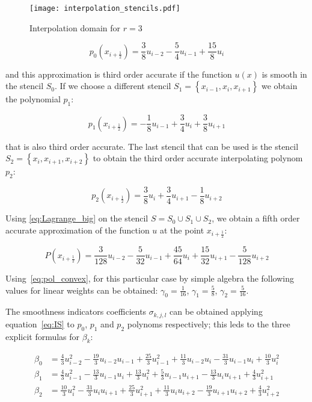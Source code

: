 \begin{figure}
   \centering
   \texttt{[image: interpolation\_stencils.pdf]}
   \caption{Interpolation domain for $r=3$}
   \label{fig:stencils_3}
\end{figure}

\begin{equation}
  \label{eq:pol_0}
  p_0(x_{i+\frac{1}{2}}) = \frac{3}{8} u_{i-2} - \frac{5}{4} u_{i-1} + \frac{15}{8} u_i
\end{equation}

and this approximation is third order accurate if the function $u(x)$ is smooth in the stencil $S_0$. If we choose a different stencil $S_1=\left\{ x_{i-1}, x_{i}, x_{i+1} \right\}$ we obtain the polynomial $p_1$:

\begin{equation}
  \label{eq:pol_1}
  p_1(x_{i+\frac{1}{2}}) = -\frac{1}{8} u_{i-1} + \frac{3}{4} u_i + \frac{3}{8} u_{i+1}
\end{equation}

that is also third order accurate. The last stencil that can be used is the stencil $S_2=\left\{ x_{i}, x_{i+1}, x_{i+2} \right\}$ to obtain the third order accurate interpolating polynom $p_2$:

\begin{equation}
  \label{eq:pol_2}
  p_2(x_{i+\frac{1}{2}}) = \frac{3}{8} u_i + \frac{3}{4} u_{i+1} - \frac{1}{8} u_{i+2}
\end{equation}

Using \eqref{eq:Lagrange_big} on the stencil $S= S_0 \cup S_1 \cup S_2$, we obtain a fifth order accurate approximation of the function $u$ at the point $x_{i+\frac{1}{2}}$:

\begin{equation}
  \label{eq:pol_union}
  P(x_{i+\frac{1}{2}}) = \frac{3}{128} u_{i-2} - \frac{5}{32} u_{i-1} + \frac{45}{64} u_i + \frac{15}{32} u_{i+1} - \frac{5}{128} u_{i+2}
\end{equation}

Using~\ref{eq:pol_convex}, for this particular case by simple algebra the following values for linear weights can be obtained: $\gamma_0 = \frac{1}{16}$, $\gamma_1 = \frac{5}{8}$, $\gamma_2 = \frac{5}{16}$.

The smoothness indicators coefficients $\sigma_{k,j,l}$ can be obtained applying equation~\ref{eq:IS} to $p_0$, $p_1$ and $p_2$ polynoms respectively; this leds to the three explicit formulas for $\beta_k$:

\begin{align}
   \beta_0 & = \frac{ 4}{3} u_{i-2}^2 - \frac{19}{3} u_{i-2} u_{i-1} + \frac{25}{3} u_{i-1}^2 + \frac{11}{3} u_{i-2} u_{i  } -\frac{31}{3} u_{i-1} u_{i  } + \frac{10}{3} u_{i  }^2 \\
   \beta_1 & = \frac{ 4}{3} u_{i-1}^2 - \frac{13}{3} u_{i-1} u_{i  } + \frac{13}{3} u_{i  }^2 + \frac{ 5}{3} u_{i-1} u_{i+1} -\frac{13}{3} u_{i  } u_{i+1} + \frac{ 4}{3} u_{i+1}^2 \\
   \beta_2 & = \frac{10}{3} u_{i  }^2 - \frac{31}{3} u_{i  } u_{i+1} + \frac{25}{3} u_{i+1}^2 + \frac{11}{3} u_{i  } u_{i+2} -\frac{19}{3} u_{i+1} u_{i+2} + \frac{ 4}{3} u_{i+2}^2
\end{align}

